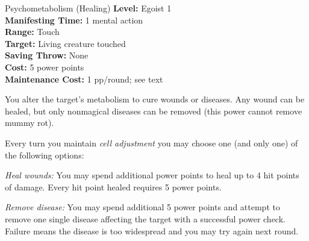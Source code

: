 {Psychometabolism (Healing)}
{
	\textbf{Level:}
	Egoist 1\\
	\textbf{Manifesting Time:}
	1 mental action\\
	\textbf{Range:}
	Touch\\
	\textbf{Target:}
	Living creature touched\\
	\textbf{Saving Throw:}
	None\\
	\textbf{Cost:}
	5 power points\\
	\textbf{Maintenance Cost:}
	1 pp/round; see text\\
}
{
	You alter the target's metabolism to cure wounds or diseases. Any wound can be healed, but only nonmagical diseases can be removed (this power cannot remove mummy rot).

	Every turn you maintain \emph{cell adjustment} you may choose one (and only one) of the following options:
	\begin{itemize*}
		\item \textit{Heal wounds:} You may spend additional power points to heal up to 4 hit points of damage. Every hit point healed requires 5 power points.

		\item \textit{Remove disease:} You may spend additional 5 power points and attempt to remove one single disease affecting the target with a successful power check. Failure means the disease is too widespread and you may try again next round.
	\end{itemize*}
}
